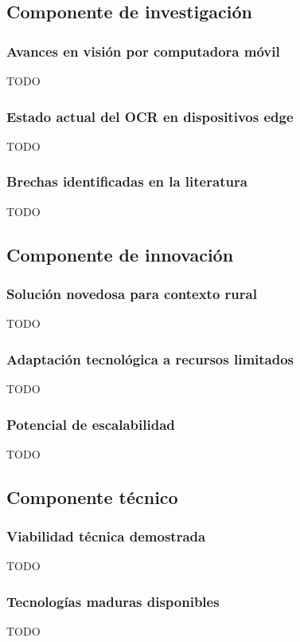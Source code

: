 \subsection{Componente de investigación}

\subsubsection{Avances en visión por computadora móvil}
TODO

\subsubsection{Estado actual del OCR en dispositivos edge}
TODO

\subsubsection{Brechas identificadas en la literatura}
TODO

\subsection{Componente de innovación}

\subsubsection{Solución novedosa para contexto rural}
TODO

\subsubsection{Adaptación tecnológica a recursos limitados}
TODO

\subsubsection{Potencial de escalabilidad}
TODO

\subsection{Componente técnico}

\subsubsection{Viabilidad técnica demostrada}
TODO

\subsubsection{Tecnologías maduras disponibles}
TODO

